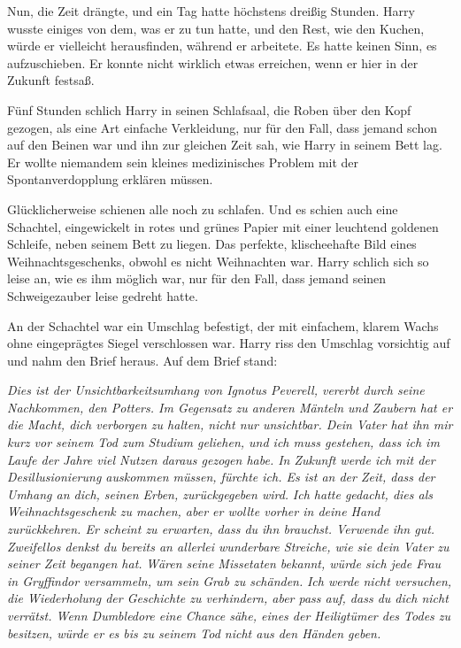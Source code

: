 Nun, die Zeit drängte, und ein Tag hatte höchstens dreißig Stunden. Harry wusste
einiges von dem, was er zu tun hatte, und den Rest, wie den Kuchen, würde er
vielleicht herausfinden, während er arbeitete. Es hatte keinen Sinn, es
aufzuschieben. Er konnte nicht wirklich etwas erreichen, wenn er hier in der
Zukunft festsaß.

Fünf Stunden schlich Harry in seinen Schlafsaal, die Roben über den Kopf
gezogen, als eine Art einfache Verkleidung, nur für den Fall, dass jemand schon
auf den Beinen war und ihn zur gleichen Zeit sah, wie Harry in seinem Bett lag.
Er wollte niemandem sein kleines medizinisches Problem mit der
Spontanverdopplung erklären müssen.

Glücklicherweise schienen alle noch zu schlafen. Und es schien auch eine
Schachtel, eingewickelt in rotes und grünes Papier mit einer leuchtend goldenen
Schleife, neben seinem Bett zu liegen. Das perfekte, klischeehafte Bild eines
Weihnachtsgeschenks, obwohl es nicht Weihnachten war. Harry schlich sich so
leise an, wie es ihm möglich war, nur für den Fall, dass jemand seinen
Schweigezauber leise gedreht hatte.

An der Schachtel war ein Umschlag befestigt, der mit einfachem, klarem Wachs
ohne eingeprägtes Siegel verschlossen war. Harry riss den Umschlag vorsichtig
auf und nahm den Brief heraus. Auf dem Brief stand:

\emph{Dies ist der Unsichtbarkeitsumhang von Ignotus Peverell, vererbt durch
seine Nachkommen, den Potters. Im Gegensatz zu anderen Mänteln und Zaubern hat
er die Macht, dich verborgen zu halten, nicht nur unsichtbar. Dein Vater hat ihn
mir kurz vor seinem Tod zum Studium geliehen, und ich muss gestehen, dass ich im
Laufe der Jahre viel Nutzen daraus gezogen habe. In Zukunft werde ich mit der
Desillusionierung auskommen müssen, fürchte ich. Es ist an der Zeit, dass der
Umhang an dich, seinen Erben, zurückgegeben wird.} \emph{ Ich hatte gedacht,
dies als Weihnachtsgeschenk zu machen, aber er wollte vorher in deine Hand
zurückkehren. Er scheint zu erwarten, dass du ihn brauchst. Verwende ihn gut.
Zweifellos denkst du bereits an allerlei wunderbare Streiche, wie sie dein Vater
zu seiner Zeit begangen hat.} \emph{ Wären seine Missetaten bekannt, würde sich
jede Frau in Gryffindor versammeln, um sein Grab zu schänden.} \emph{ Ich werde
nicht versuchen, die Wiederholung der Geschichte zu verhindern, aber pass auf,
dass du dich nicht verrätst. Wenn Dumbledore eine Chance sähe, eines der
Heiligtümer des Todes zu besitzen, würde er es bis zu seinem Tod nicht aus den
Händen geben.}

